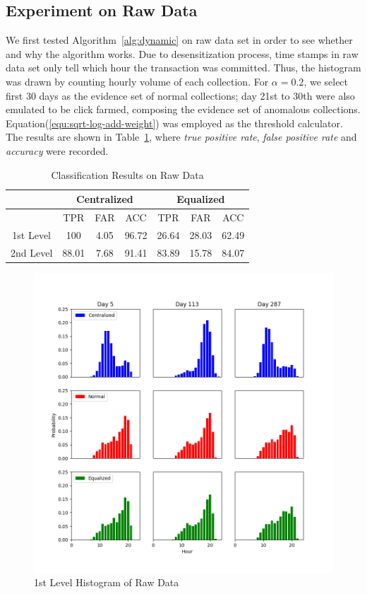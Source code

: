 \documentclass[a4paper]{IEEEtran}
\begin{document}
		\subsection{Experiment on Raw Data}
			We first tested Algorithm~\ref{alg:dynamic} on raw data set in order to see whether and why the algorithm works. Due to desensitization process, time stamps in raw data set only tell which hour the transaction was committed. Thus, the histogram was drawn by counting hourly volume of each collection. For $\alpha = 0.2$, we select first 30 days as the evidence set of normal collections; day 21st to 30th were also emulated to be click farmed, composing the evidence set of anomalous collections. Equation(\ref{equ:sqrt-log-add-weight}) was employed as the threshold calculator. The results are shown in Table~\ref{tab:result-raw-1st}, where \textit{true positive rate}, \textit{false positive rate} and \textit{accuracy} were recorded.
			
			\begin{table}[!ht]
				\centering
				\caption{Classification Results on Raw Data}
				\label{tab:result-raw-1st}
				\begin{tabular}{|c|c|c|c|c|c|c|}
					\hline
					& \multicolumn{3}{c|}{Centralized} & \multicolumn{3}{c|}{Equalized}\\
					\hline
					& TPR & FAR & ACC & TPR & FAR & ACC\\
					\hline
					1st Level & 100 & 4.05 & 96.72 & 26.64 & 28.03 & 62.49\\
					\hline
					2nd Level & 88.01 & 7.68 & 91.41 & 83.89 & 15.78 & 84.07\\
					\hline
				\end{tabular}
			\end{table}
			
			\begin{figure}[!ht]
				\centering
				\includegraphics[width=\linewidth]{fig/Raw1stLevelHist.png}
				\caption{1st Level Histogram of Raw Data}
				\label{fig:raw-hist-1st}
			\end{figure}
			
\end{document}
